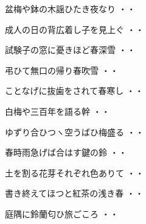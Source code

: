 \vspace{0.6cm}
\begin{shiika}盆梅や鉢の木謡ひたき夜なり
\hfill{・・}\end{shiika}
\vspace{0.6cm}
\begin{shiika}成人の日の背広着し子を見上ぐ
\hfill{・・}\end{shiika}
\vspace{0.6cm}
\begin{shiika}試験子の窓に憂きほど春深雪
\hfill{・・}\end{shiika}
\vspace{0.6cm}
\begin{shiika}弔ひて無口の帰り春吹雪
\hfill{・・}\end{shiika}
\vspace{0.6cm}
\begin{shiika}ことなげに抜歯をされて春寒し
\hfill{・・}\end{shiika}
\vspace{0.6cm}
\begin{shiika}白梅や三百年を語る幹
\hfill{・・}\end{shiika}
\vspace{0.6cm}
\begin{shiika}ゆずり合ひつヽ空うばひ梅盛る
\hfill{・・}\end{shiika}
\vspace{0.6cm}
\begin{shiika}春時雨急げば合はす鍵の鈴
\hfill{・・}\end{shiika}
\vspace{0.6cm}
\begin{shiika}土を割る花芽それぞれ色ありて
\hfill{・・}\end{shiika}
\vspace{0.6cm}
\begin{shiika}書き終えてほつと紅茶の浅き春
\hfill{・・}\end{shiika}
\vspace{0.6cm}
\begin{shiika}庭隅に鈴蘭匂ひ旅ごころ
\hfill{・・}\end{shiika}
